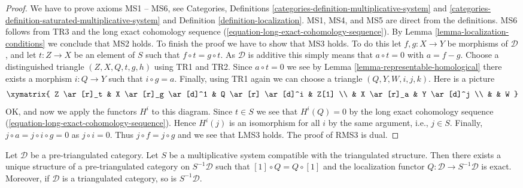 \begin{proof}
We have to prove axioms MS1 -- MS6, see
Categories, Definitions \ref{categories-definition-multiplicative-system} and
\ref{categories-definition-saturated-multiplicative-system}
and
Definition \ref{definition-localization}.
MS1, MS4, and MS5 are direct from the definitions.
MS6 follows from TR3 and the long exact cohomology sequence
(\ref{equation-long-exact-cohomology-sequence}).
By
Lemma \ref{lemma-localization-conditions}
we conclude that MS2 holds. To finish the proof we have to show that
MS3 holds. To do this let $f, g : X \to Y$ be morphisms of $\mathcal{D}$,
and let $t : Z \to X$ be an element of $S$ such that $f \circ t = g \circ t$.
As $\mathcal{D}$ is additive this simply means that $a \circ t = 0$ with
$a = f - g$. Choose a distinguished triangle $(Z, X, Q, t, g, h)$ using
TR1 and TR2. Since $a \circ t = 0$ we see by
Lemma \ref{lemma-representable-homological}
there exists a morphism $i : Q \to Y$ such that $i \circ g = a$.
Finally, using TR1 again we can choose a triangle
$(Q, Y, W, i, j, k)$. Here is a picture
$$
\xymatrix{
Z \ar[r]_t & X \ar[r]_g \ar[d]^1 & Q \ar[r] \ar[d]^i & Z[1] \\
& X \ar[r]_a & Y \ar[d]^j \\
& & W
}
$$
OK, and now we apply the functors $H^i$ to this diagram.
Since $t \in S$ we see that $H^i(Q) = 0$ by the long exact cohomology
sequence (\ref{equation-long-exact-cohomology-sequence}).
Hence $H^i(j)$ is an isomorphism for all $i$ by the same argument,
i.e., $j \in S$. Finally, $j \circ a = j \circ i \circ g = 0$ as
$j \circ i = 0$. Thus $j \circ f = j \circ g$ and we see that LMS3 holds.
The proof of RMS3 is dual.
\end{proof}

\begin{proposition}
\label{proposition-construct-localization}
Let $\mathcal{D}$ be a pre-triangulated category. Let $S$ be a multiplicative
system compatible with the triangulated structure.
Then there exists a unique structure of a pre-triangulated category on
$S^{-1}\mathcal{D}$ such that $[1] \circ Q = Q \circ [1]$ and
the localization functor $Q : \mathcal{D} \to S^{-1}\mathcal{D}$ is exact.
Moreover, if $\mathcal{D}$ is a triangulated category, so is
$S^{-1}\mathcal{D}$.
\end{proposition}

